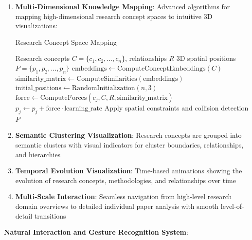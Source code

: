 \documentclass[10pt,twocolumn]{article}
\begin{document}
\begin{enumerate}
    \item \textbf{Multi-Dimensional Knowledge Mapping}: Advanced algorithms for mapping high-dimensional research concept spaces to intuitive 3D visualizations:
    
    \begin{algorithm}[H]
    \caption{Research Concept Space Mapping}
    \label{alg:concept_mapping}
    \begin{algorithmic}[1]
    \REQUIRE Research concepts $C = \{c_1, c_2, ..., c_n\}$, relationships $R$
    \ENSURE 3D spatial positions $P = \{p_1, p_2, ..., p_n\}$
    \STATE $\text{embeddings} \leftarrow \text{ComputeConceptEmbeddings}(C)$
    \STATE $\text{similarity\_matrix} \leftarrow \text{ComputeSimilarities}(\text{embeddings})$
    \STATE $\text{initial\_positions} \leftarrow \text{RandomInitialization}(n, 3)$
            \STATE $\text{force} \leftarrow \text{ComputeForces}(c_j, C, R, \text{similarity\_matrix})$
            \STATE $p_j \leftarrow p_j + \text{force} \cdot \text{learning\_rate}$
        \ENDFOR
        \STATE Apply spatial constraints and collision detection
    \ENDFOR
    \RETURN $P$
    \end{algorithmic}
    \end{algorithm}
    
    \item \textbf{Semantic Clustering Visualization}: Research concepts are grouped into semantic clusters with visual indicators for cluster boundaries, relationships, and hierarchies
    
    \item \textbf{Temporal Evolution Visualization}: Time-based animations showing the evolution of research concepts, methodologies, and relationships over time
    
    \item \textbf{Multi-Scale Interaction}: Seamless navigation from high-level research domain overviews to detailed individual paper analysis with smooth level-of-detail transitions
\end{enumerate}

\textbf{Natural Interaction and Gesture Recognition System}:
\end{document}
